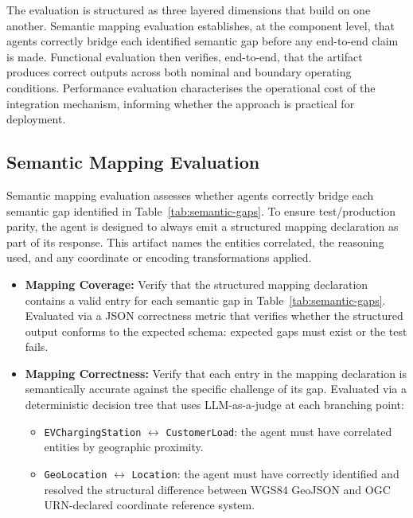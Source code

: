 The evaluation is structured as three layered dimensions that build on one another.
Semantic mapping evaluation establishes, at the component level, that agents correctly
    bridge each identified semantic gap before any end-to-end claim is made.
Functional evaluation then verifies, end-to-end, that the artifact produces correct
    outputs across both nominal and boundary operating conditions.
Performance evaluation characterises the operational cost of the integration mechanism,
    informing whether the approach is practical for deployment.

\subsection{Semantic Mapping Evaluation}
\label{subsec:semantic-mapping-evaluation}

Semantic mapping evaluation assesses whether agents correctly bridge each semantic gap
    identified in Table~\ref{tab:semantic-gaps}.
To ensure test/production parity, the agent is designed to always emit a
    structured mapping declaration as part of its response.
This artifact names the entities correlated, the reasoning used,
    and any coordinate or encoding transformations applied.

\begin{itemize}
    \item \textbf{Mapping Coverage:} %
    Verify that the structured mapping declaration contains a valid entry for each
        semantic gap in Table~\ref{tab:semantic-gaps}.
    Evaluated via a JSON correctness metric that verifies whether the structured output
        conforms to the expected schema: expected gaps must exist or the test fails.

    \item \textbf{Mapping Correctness:} %
    Verify that each entry in the mapping declaration is semantically accurate
        against the specific challenge of its gap.
    Evaluated via a deterministic decision tree that uses LLM-as-a-judge at each
        branching point:
    \begin{itemize}
        \item \texttt{EVChargingStation} $\leftrightarrow$ \texttt{CustomerLoad}:
            the agent must have correlated entities by geographic proximity.
        \item \texttt{GeoLocation} $\leftrightarrow$
            \texttt{Location}:
            the agent must have correctly identified and resolved the structural
            difference between WGS84 GeoJSON and OGC URN-declared
            coordinate reference system.
    \end{itemize}
\end{itemize}

